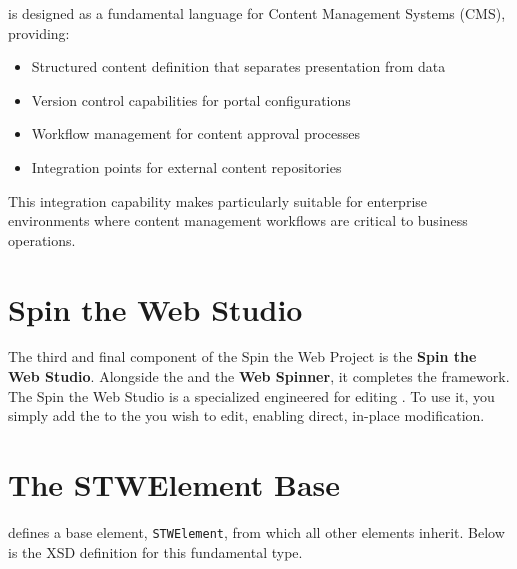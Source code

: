 \wbdl{} is designed as a fundamental language for Content Management Systems (CMS), providing:

\begin{itemize}
\item Structured content definition that separates presentation from data
\item Version control capabilities for portal configurations
\item Workflow management for content approval processes
\item Integration points for external content repositories
\end{itemize}

This integration capability makes \wbdl{} particularly suitable for enterprise environments where content management workflows are critical to business operations.

\section{Spin the Web Studio}
\label{sec:studio}

The third and final component of the Spin the Web Project is the \textbf{Spin the Web Studio}. Alongside the \textbf{\wbdl{}} and the \textbf{Web Spinner}, it completes the framework. The Spin the Web Studio is a specialized \webbaselet{} engineered for editing . To use it, you simply add the \webbaselet{} to the \webbase{} you wish to edit, enabling direct, in-place modification.

\section{The STWElement Base}
\label{sec:stwelement-base}

\wbdl{} defines a base element, \texttt{STWElement}, from which all other elements inherit. Below is the XSD definition for this fundamental type.

